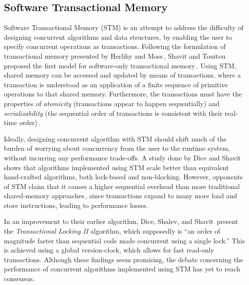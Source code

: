 \subsection{Software Transactional Memory}
Software Transactional Memory (STM) is an attempt to address the difficulty of designing concurrent algorithms and data structures, by enabling the user to specify concurrent operations as transactions. Following the formulation of transactional memory presented by Herlihy and Moss\,\citep{HerlihyMossTM}, Shavit and Touitou proposed the first model for software-only transactional memory\,\citep{ShavitSTM}. Using STM, shared memory can be accessed and updated by means of transactions, where a transaction is understood as an application of a finite sequence of primitive operations to that shared memory. Furthermore, the transactions must have the properties of \emph{atomicity} (transactions appear to happen sequentially) and \emph{serializability} (the sequential order of transactions is consistent with their real-time order)\,\cite{ShavitSTM}.

Ideally, designing concurrent algorithm with STM should shift much of the burden of worrying about concurrency from the user to the runtime system, without incurring any performance trade-offs. A study done by Dice and Shavit\,\citep{Dice06whatreally} shows that algorithms implemented using STM scale better than equivalent hand-crafted algorithms, both lock-based and non-blocking. However, opponents of STM claim that it causes a higher sequential overhead than more traditional shared-memory approaches\,\citep{Cascaval08}, since transactions expand to many more load and store instructions, leading to performance losses.

In an improvement to their earlier algorithm, Dice, Shalev, and Shavit\,\citep{DiceTLII} present the \emph{Transactional Locking II} algorithm, which supposedly is ``an order of magnitude faster than sequential code made concurrent using a single lock.'' This is achieved using a global version-clock, which allows for fast read-only transactions. Although these findings seem promising, the debate concerning the performance of concurrent algorithms implemented using STM has yet to reach consensus.
